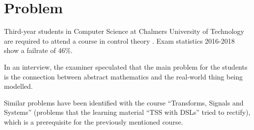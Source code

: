 \section{Problem}
Third-year students in Computer Science at Chalmers University of Technology are required to attend a course in control theory \cite{data_program_blad_2018}. Exam statistics 2016-2018 show a failrate of 46\%\cite{exam_stat_regler}. 

In an interview\cite{tssarbete}, the examiner speculated that the main problem for the students is the connection between abstract mathematics and the real-world thing being modelled.

Similar problems have been identified with the course ``Transforms, Signals and Systems'' (problems that the learning material ``TSS with DSLs'' \cite{tssarbete} tried to rectify), which is a prerequisite for the previously mentioned course.


% 




